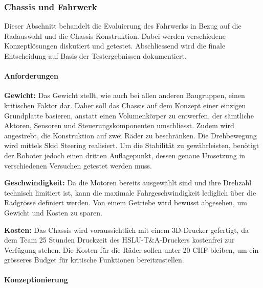 \documentclass[main.tex]{subfiles} %
\begin{document}

\subsubsection{Chassis und Fahrwerk}

Dieser Abschnitt behandelt die Evaluierung des Fahrwerks in Bezug auf die Radauswahl
und die Chassis-Konstruktion. Dabei werden verschiedene Konzeptlösungen diskutiert und
getestet. Abschliessend wird die finale Entscheidung auf Basis der Testergebnissen dokumentiert.

\paragraph{Anforderungen}

\textbf{Gewicht:} \newline
Das Gewicht stellt, wie auch bei allen anderen Baugruppen, einen kritischen Faktor dar.
Daher soll das Chassis auf dem Konzept einer einzigen Grundplatte basieren, anstatt 
einen Volumenkörper zu entwerfen, der sämtliche Aktoren, Sensoren und Steuerungskomponenten
umschliesst. Zudem wird angestrebt, die Konstruktion auf zwei Räder zu beschränken.
Die Drehbewegung wird mittels Skid Steering realisiert. Um die Stabilität zu gewährleisten,
benötigt der Roboter jedoch einen dritten Auflagepunkt, dessen genaue Umsetzung in
verschiedenen Versuchen getestet werden muss.

\textbf{Geschwindigkeit:} \newline
Da die Motoren bereits ausgewählt sind und ihre Drehzahl technisch limitiert ist,
kann die maximale Fahrgeschwindigkeit lediglich über die Radgrösse definiert werden.
Von einem Getriebe wird bewusst abgesehen, um Gewicht und Kosten zu sparen.

\textbf{Kosten:} \newline
Das Chassis wird voraussichtlich mit einem 3D-Drucker gefertigt, da dem Team 25 Stunden
Druckzeit des HSLU-T\&A-Druckers kostenfrei zur Verfügung stehen. Die Kosten für die Räder
sollen unter 20 CHF bleiben, um ein grösseres Budget für kritische Funktionen bereitzustellen.

\paragraph{Konzeptionierung}
\end{document}

